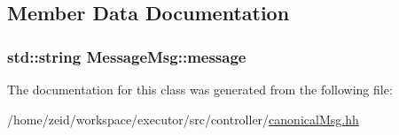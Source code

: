 \subsection{Member Data Documentation}
\hypertarget{class_message_msg_a48dfcf9a02b08e06b3d65e05cd898a45}{
\subsubsection[{message}]{\setlength{\rightskip}{0pt plus 5cm}std::string {\bf MessageMsg::message}}}
\label{class_message_msg_a48dfcf9a02b08e06b3d65e05cd898a45}


The documentation for this class was generated from the following file:\begin{DoxyCompactItemize}
\item 
/home/zeid/workspace/executor/src/controller/\hyperlink{canonical_msg_8hh}{canonicalMsg.hh}\end{DoxyCompactItemize}
